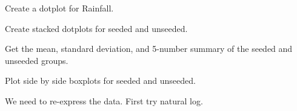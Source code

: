 \documentclass[12pt,letterpaper]{hmcpset}
\begin{document}

\begin{problem}[a]

    Create a dotplot for Rainfall.

\end{problem}

\begin{solution}

\end{solution}
\newpage

\begin{problem}[b]

    Create stacked dotplots for seeded and unseeded.

\end{problem}

\begin{solution}

\end{solution}
\newpage

\begin{problem}[c]

    Get the mean, standard deviation, and 5-number summary of the seeded and unseeded groups.

\end{problem}

\begin{solution}

\end{solution}
\newpage

\begin{problem}[d]

    Plot side by side boxplots for seeded and unseeded.

\end{problem}

\begin{solution}

\end{solution}
\newpage

\begin{problem}[e]

    We need to re-express the data. First try natural log.

\end{problem}

\begin{solution}

\end{solution}
\newpage
\end{document}
